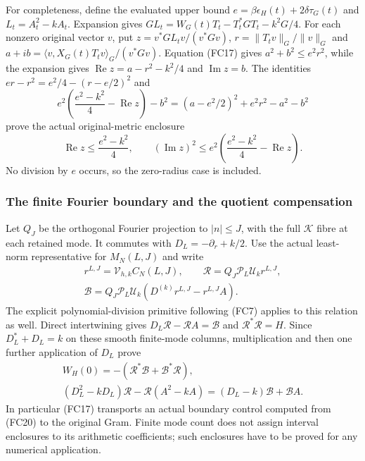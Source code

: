 For completeness, define the evaluated upper bound
$e=\beta\epsilon_H(t)+2\delta\tau_G(t)$ and $L_t=A_t^2-kA_t$.
Expansion gives $GL_t=W_G(t)T_t-T_t^*GT_t-k^2G/4$.
For each nonzero original vector $v$, put
$z=v^*GL_tv/(v^*Gv)$, $r=\|T_tv\|_G/\|v\|_G$ and
$a+ib=\langle v,X_G(t)T_tv\rangle_G/(v^*Gv)$.
Equation (FC17) gives $a^2+b^2\le e^2r^2$, while the expansion gives
$\operatorname{Re}z=a-r^2-k^2/4$ and $\operatorname{Im}z=b$.
The identities $er-r^2=e^2/4-(r-e/2)^2$ and
\[
 e^2\left(\frac{e^2-k^2}{4}-\operatorname{Re}z\right)-b^2
 =(a-e^2/2)^2+e^2r^2-a^2-b^2
\]
prove the actual original-metric enclosure
\[
 \operatorname{Re}z\le\frac{e^2-k^2}{4},\qquad
 (\operatorname{Im}z)^2\le e^2
       \left(\frac{e^2-k^2}{4}-\operatorname{Re}z\right).
 \tag{FC18}
\]
No division by $e$ occurs, so the zero-radius case is included.

\subsubsection{The finite Fourier boundary and the quotient compensation}

Let $Q_J$ be the orthogonal Fourier projection to $|n|\le J$, with
the full $\mathcal K$ fibre at each retained mode. It commutes with
$D_L=-\partial_r+k/2$. Use the actual least-norm representative for
$M_N(L,J)$ and write
\[
\begin{gathered}
 r^{L,J}=\mathcal V_{h,k}C_N(L,J),\qquad
 \mathscr R=Q_J\mathcal P_L\mathcal U_kr^{L,J},\\
 \mathscr B=Q_J\mathcal P_L\mathcal U_k
                (D^{(k)}r^{L,J}-r^{L,J}A).
\end{gathered}\tag{FC19}
\]
The explicit polynomial-division primitive following (FC7) applies
to this relation as well. Direct intertwining gives
$D_L\mathscr R-\mathscr RA=\mathscr B$ and $\mathscr R^*\mathscr R=H$.
Since $D_L^*+D_L=k$ on these smooth finite-mode columns, multiplication
and then one further application of $D_L$ prove
\[
\begin{gathered}
 W_H(0)=-(\mathscr R^*\mathscr B+\mathscr B^*\mathscr R),\\
 (D_L^2-kD_L)\mathscr R-\mathscr R(A^2-kA)
                    =(D_L-k)\mathscr B+\mathscr BA.
\end{gathered}\tag{FC20}
\]
In particular (FC17) transports an actual boundary control computed
from (FC20) to the original Gram. Finite mode count does not assign
interval enclosures to its arithmetic coefficients; such enclosures
have to be proved for any numerical application.

